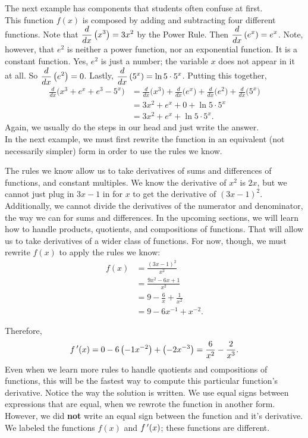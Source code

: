The next example has components that students often confuse at first.\\

{
This function $f(x)$ is composed by adding and subtracting four different functions.  Note that $\displaystyle \frac{d}{dx}\left(x^3\right)=3x^2$ by the Power Rule.
Then $\displaystyle \frac{d}{dx}\left(e^x\right)=e^x$.  Note, however, that $e^2$ is neither a power function, nor an exponential function.  It is a constant function.  Yes, $e^2$ is just a number; the variable $x$ does not appear in it at all.  So  $\displaystyle \frac{d}{dx}\left(e^2\right)=0$.
Lastly,  $\displaystyle \frac{d}{dx}\left(5^x\right)=\ln 5\cdot 5^x$.  Putting this together,
		\begin{align*}
		\frac{d}{dx}\Big(x^3 + e^x + e^3 - 5^x\Big) &= \frac{d}{dx}\Big(x^3\Big) + \frac{d}{dx}\Big(e^x\Big) + \frac{d}{dx}\Big(e^2\Big) +\frac{d}{dx}\Big(5^x\Big) \\
																		&= 3x^2+e^x+0+\ln 5\cdot 5^x\\
																		&= 3x^2+e^x+\ln 5\cdot 5^x.
		\end{align*}
Again, we usually do the steps in our head and just write the answer.
}\\

In the next example, we must first rewrite the function in an equivalent (not necessarily simpler) form in order to use the rules we know.

{The rules we know allow us to take derivatives of sums and differences of functions, and constant multiples.  We know the derivative of $x^2$ is $2x$, but we cannot just plug in $3x-1$ in for $x$ to get the derivative of $(3x-1)^2$.  Additionally, we cannot divide the derivatives of the numerator and denominator, the way we can for sums and differences.  In the upcoming sections, we will learn how to handle products, quotients, and compositions of functions.  That will allow us to take derivatives of a wider class of functions.  For now, though, we must rewrite $f(x)$ to apply the rules we know:
\begin{align*}
f(x)&=\frac{(3x-1)^2}{x^2}\\
&=\frac{9x^2-6x+1}{x^2}\\
&=9-\frac{6}{x}+\frac{1}{x^2}\\
&=9-6x^{-1}+x^{-2}.
\end{align*}

Therefore,$$f\,'(x)=0-6\left(-1x^{-2}\right)+\left(-2x^{-3}\right)=\frac{6}{x^2}-\frac{2}{x^3}.$$
Even when we learn more rules to handle quotients and compositions of functions, this will be the fastest way to compute this particular function's derivative.  Notice the way the solution is written.  We use equal signs between expressions that are equal, when we rewrote the function in another form.  However, we did \textbf{not} write an equal sign between the function and it's derivative.  We labeled the functions $f(x)$ and $f\,'(x)$; these functions are different.
}\\

